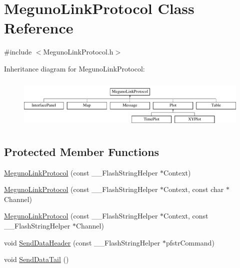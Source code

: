 \hypertarget{class_meguno_link_protocol}{\section{Meguno\-Link\-Protocol Class Reference}
\label{class_meguno_link_protocol}
}


{\ttfamily \#include $<$Meguno\-Link\-Protocol.\-h$>$}

Inheritance diagram for Meguno\-Link\-Protocol\-:\begin{figure}[H]
\begin{center}
\leavevmode
\includegraphics[height=2.470588cm]{class_meguno_link_protocol}
\end{center}
\end{figure}
\subsection*{Protected Member Functions}
\begin{DoxyCompactItemize}
\item 
\hyperlink{class_meguno_link_protocol_a1a41563101812429db505a864d54e25b}{Meguno\-Link\-Protocol} (const \-\_\-\-\_\-\-Flash\-String\-Helper $\ast$Context)
\item 
\hyperlink{class_meguno_link_protocol_a776a0782ec405f4aba9ef62eb124de56}{Meguno\-Link\-Protocol} (const \-\_\-\-\_\-\-Flash\-String\-Helper $\ast$Context, const char $\ast$Channel)
\item 
\hyperlink{class_meguno_link_protocol_a280ecd2f5eba95b1b84b42e9c66b847e}{Meguno\-Link\-Protocol} (const \-\_\-\-\_\-\-Flash\-String\-Helper $\ast$Context, const \-\_\-\-\_\-\-Flash\-String\-Helper $\ast$Channel)
\item 
void \hyperlink{class_meguno_link_protocol_ac5d2073ce4b1d2be588e9d17b730c0a0}{Send\-Data\-Header} (const \-\_\-\-\_\-\-Flash\-String\-Helper $\ast$pfstr\-Command)
\item 
void \hyperlink{class_meguno_link_protocol_aa942a79da2f6b1ffdb24249947d7a27e}{Send\-Data\-Tail} ()
\end{DoxyCompactItemize}


